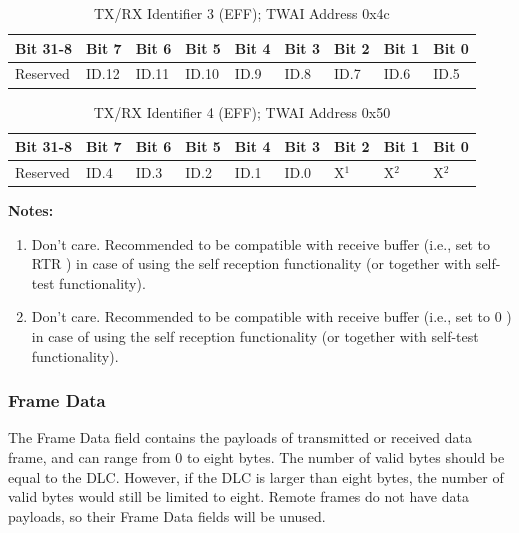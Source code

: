 \documentclass[main\_\_EN.tex]{subfiles}
\begin{document}
\begin{longtable}[c]{|p{1.4cm}|p{1.4cm}|p{1.4cm}|p{1.4cm}|p{1.4cm}|p{1.4cm}|p{1.4cm}|p{1.4cm}|p{1.4cm}|}
    \caption{TX/RX Identifier 3 (EFF); TWAI Address 0x4c}
    \label{tab:twai-tx-rx-identifier-3-eff}\\
    \hline
       \rowcolor{lightgray}
    \textbf{Bit 31-8} & \textbf{Bit 7} & \textbf{Bit 6} & \textbf{Bit 5} & \textbf{Bit 4} & \textbf{Bit 3} & \textbf{Bit 2} & \textbf{Bit 1} & \textbf{Bit 0}\\\hline 
    Reserved & ID.12 & ID.11 & ID.10 & ID.9 & ID.8 & ID.7 & ID.6 & ID.5\\
    \hline
\end{longtable}

\begin{longtable}[c]{|p{1.4cm}|p{1.4cm}|p{1.4cm}|p{1.4cm}|p{1.4cm}|p{1.4cm}|p{1.4cm}|p{1.4cm}|p{1.4cm}|}
    \caption{TX/RX Identifier 4 (EFF); TWAI Address 0x50}
    \label{tab:twai-tx-rx-identifier-4-eff}\\
    \hline
       \rowcolor{lightgray}
    \textbf{Bit 31-8} & \textbf{Bit 7} & \textbf{Bit 6} & \textbf{Bit 5} & \textbf{Bit 4} & \textbf{Bit 3} & \textbf{Bit 2} & \textbf{Bit 1} & \textbf{Bit 0}\\\hline
    Reserved & ID.4 & ID.3 & ID.2 & ID.1 & ID.0 & X$^1$ & X$^2$ & X$^2$\\
    \hline
\end{longtable}
\vspace{-1.5em}
{\bfseries Notes:}\\
\begin{enumerate}
    \item Don't care. Recommended to be compatible with receive buffer (i.e., set to RTR ) in case of using the self reception functionality (or together with self-test functionality).
    \item Don't care. Recommended to be compatible with receive buffer (i.e., set to 0 ) in case of using the self reception functionality (or together with self-test functionality). 
\end{enumerate}

\subsubsection{Frame Data}
The Frame Data field contains the payloads of transmitted or received data frame, and can range from 0 to eight bytes. The number of valid bytes should be equal to the DLC. However, if the DLC is larger than eight bytes, the number of valid bytes would still be limited to eight. Remote frames do not have data payloads, so their Frame Data fields will be unused.
\end{document}
